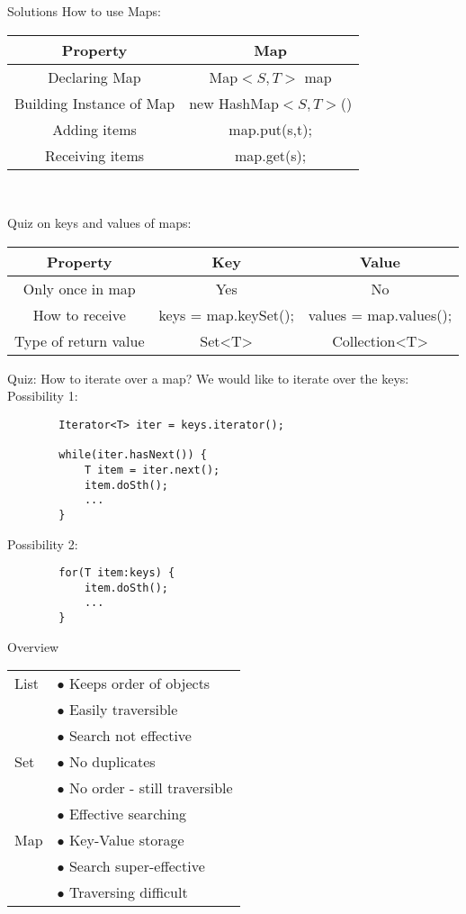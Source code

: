 \begin{frame}{Solutions}
	How to use Maps:\\
	\begin{tabular}{c|c}
		Property&Map\\
		\hline
		Declaring Map&Map$< S,T >$ map\\
		Building Instance of Map&new HashMap$<S,T>$()\\
		Adding items&map.put(s,t);\\
		Receiving items&map.get(s);
	\end{tabular}\\
	\vspace{1cm}
	
	Quiz on keys and values of maps:\\
	\vspace{0.5cm}
	\begin{tabular}{c|c|c}
		Property&Key&Value\\
		\hline
		Only once in map&Yes&No\\
		How to receive&keys = map.keySet();&values = map.values();\\
		Type of return value&Set<T>&Collection<T>\\
	\end{tabular}
\end{frame}

\begin{frame}[fragile]{Quiz: How to iterate over a map?}
	We would like to iterate over the keys: \\
	Possibility 1:
	\pause
	\begin{lstlisting}
		Iterator<T> iter = keys.iterator();
		
		while(iter.hasNext()) {
			T item = iter.next();
			item.doSth();
			...
		}
	\end{lstlisting}
	
	\pause
	Possibility 2:
	\pause
	\begin{lstlisting}
		for(T item:keys) {
			item.doSth();
			...
		}
	\end{lstlisting}
\end{frame}

\begin{frame}{Overview}
	\begin{center}
		\begin{tabular}{ l | l }
			List & $ \bullet $ Keeps order of objects \\
			& $ \bullet $ Easily traversible \\
			& $ \bullet $ Search not effective \\
			\hline
			Set  & $ \bullet $ No duplicates \\
			& $ \bullet $ No order - still traversible \\
			& $ \bullet $ Effective searching \\
			\hline
			Map  & $ \bullet $ Key-Value storage \\
			& $ \bullet $ Search super-effective \\
			& $ \bullet $ Traversing difficult
			
		\end{tabular}
	\end{center}
\end{frame}

